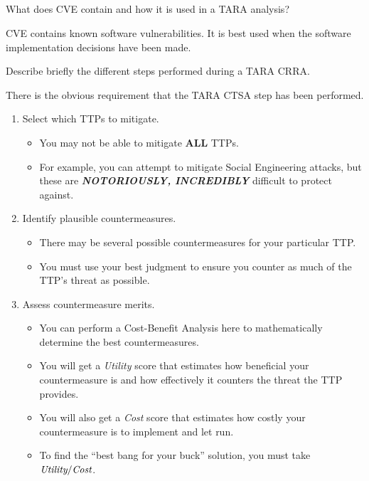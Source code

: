 \begin{questions}
\begin{parts}
  \part{} What does CVE contain and how it is used in a TARA analysis?
    \begin{solution}
      CVE contains known software vulnerabilities.
      It is best used when the software implementation decisions have been made.
    \end{solution}
  \end{parts}

\question{} Describe briefly the different steps performed during a TARA CRRA.\@
  \begin{solution}
    There is the obvious requirement that the TARA CTSA step has been performed.
    \begin{enumerate}[noitemsep]
    \item Select which TTPs to mitigate.
      \begin{itemize}[noitemsep]
      \item You may not be able to mitigate \textbf{ALL} TTPs.
      \item For example, you can attempt to mitigate Social Engineering attacks, but these are \emph{\textbf{NOTORIOUSLY, INCREDIBLY}} difficult to protect against.
      \end{itemize}
    \item Identify plausible countermeasures.
      \begin{itemize}[noitemsep]
      \item There may be several possible countermeasures for your particular TTP.\@
      \item You must use your best judgment to ensure you counter as much of the TTP's threat as possible.
      \end{itemize}
    \item Assess countermeasure merits.
      \begin{itemize}[noitemsep]
      \item You can perform a Cost-Benefit Analysis here to mathematically determine the best countermeasures.
      \item You will get a \emph{Utility} score that estimates how beneficial your countermeasure is and how effectively it counters the threat the TTP provides.
      \item You will also get a \emph{Cost} score that estimates how costly your countermeasure is to implement and let run.
      \item To find the ``best bang for your buck'' solution, you must take $\emph{Utility}/\emph{Cost}$.

\end{itemize}
\end{enumerate}
\end{solution}
\end{questions}
